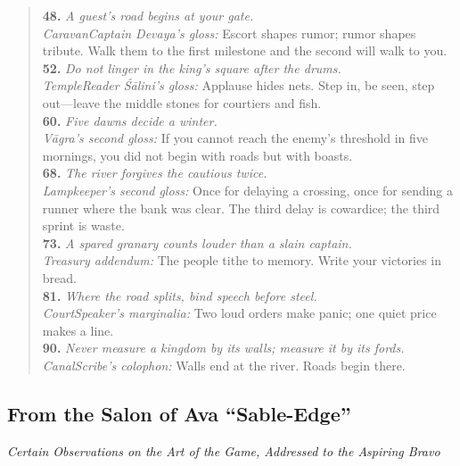 \documentclass[11pt]{article}
\begin{document}
\begin{quote}
\textbf{48.} \emph{A guest’s road begins at your gate.}\\
\textit{Caravan\textendash Captain Devaya’s gloss:} Escort shapes rumor; rumor shapes tribute. Walk them to the first milestone and the second will walk to you.\\[0.35em]

\textbf{52.} \emph{Do not linger in the king’s square after the drums.}\\
\textit{Temple\textendash Reader Śālini’s gloss:} Applause hides nets. Step in, be seen, step out—leave the middle stones for courtiers and fish.\\[0.35em]

\textbf{60.} \emph{Five dawns decide a winter.}\\
\textit{Vāgra’s second gloss:} If you cannot reach the enemy’s threshold in five mornings, you did not begin with roads but with boasts.\\[0.35em]

\textbf{68.} \emph{The river forgives the cautious twice.}\\
\textit{Lampkeeper’s second gloss:} Once for delaying a crossing, once for sending a runner where the bank was clear. The third delay is cowardice; the third sprint is waste.\\[0.35em]

\textbf{73.} \emph{A spared granary counts louder than a slain captain.}\\
\textit{Treasury addendum:} The people tithe to memory. Write your victories in bread.\\[0.35em]

\textbf{81.} \emph{Where the road splits, bind speech before steel.}\\
\textit{Court\textendash Speaker’s marginalia:} Two loud orders make panic; one quiet price makes a line.\\[0.35em]

\textbf{90.} \emph{Never measure a kingdom by its walls; measure it by its fords.}\\
\textit{Canal\textendash Scribe’s colophon:} Walls end at the river. Roads begin there.
\end{quote}

\subsection{From the Salon of Ava ``Sable-Edge''}
\noindent\textit{Certain Observations on the Art of the Game, Addressed to the Aspiring Bravo}
\end{document}
